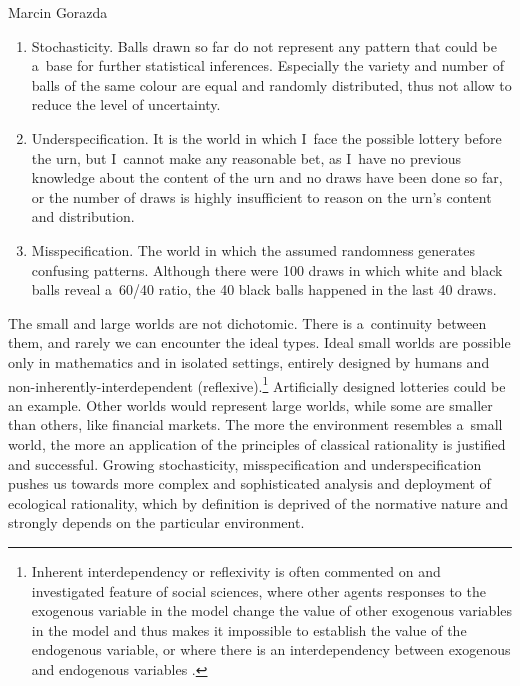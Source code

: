 \begin{artengenv}{Marcin Gorazda}
\begin{enumerate}
\item Stochasticity. Balls drawn so far do not represent any pattern that could be a~base for further statistical inferences. Especially the variety and number of balls of the same colour are equal and randomly distributed, thus not allow to reduce the level of uncertainty.
\item Underspecification. It is the world in which I~face the possible lottery before the urn, but I~cannot make any reasonable bet, as I~have no previous knowledge about the content of the urn and no draws have been done so far, or the number of draws is highly insufficient to reason on the urn's content and distribution.
\item Misspecification. The world in which the assumed randomness generates confusing patterns. Although there were 100 draws in which white and black balls reveal a~60/40 ratio, the 40 black balls happened in the last 40 draws.
\end{enumerate}
The small and large worlds are not dichotomic. There is a~continuity between them, and rarely we can encounter the ideal types. Ideal small worlds are possible only in mathematics and in isolated settings, entirely designed by humans and non-inherently-interdependent (reflexive).\footnote{Inherent interdependency or reflexivity is often commented on and investigated feature of social sciences, where other agents responses to the exogenous variable in the model change the value of other exogenous variables in the model and thus makes it impossible to establish the value of the endogenous variable, or where there is an interdependency between exogenous and endogenous variables
\parencites[][]{soros_fallibility_2013}[][]{beinhocker_reflexivity_2013}[][]{nowak-posadzy_refleksyjnosc_2016}.%
} Artificially designed lotteries could be an example. Other worlds would represent large worlds, while some are smaller than others, like financial markets. The more the environment resembles a~small world, the more an application of the principles of classical rationality is justified and successful. Growing stochasticity, misspecification and underspecification pushes us towards more complex and sophisticated analysis and deployment of ecological rationality, which by definition is deprived of the normative nature and strongly depends on the particular environment.


\end{artengenv}
